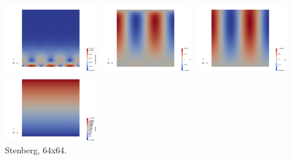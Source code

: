 \begin{center}
\includegraphics[width=4cm]{python_codes/fieldstone_78/results/exp05/vel}
\includegraphics[width=4cm]{python_codes/fieldstone_78/results/exp05/p}
\includegraphics[width=4cm]{python_codes/fieldstone_78/results/exp05/by}
\includegraphics[width=4cm]{python_codes/fieldstone_78/results/exp05/eta}\\
{\captionfont Stenberg, 64x64.}
\end{center}



